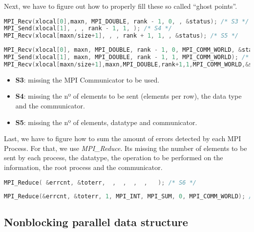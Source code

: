 \documentclass[a4paper, 10pt]{article}
\begin{document}
    Next, we have to figure out how to properly fill these so called ``ghost points''. 


    \begin{lstlisting}[language=c, caption={Template S3, S4, S5}]
MPI_Recv(xlocal[0],maxn, MPI_DOUBLE, rank - 1, 0, , &status); /* S3 */
MPI_Send(xlocal[1], , , rank - 1, 1, ); /* S4 */
MPI_Recv(xlocal[maxn/size+1], , , rank + 1, 1, , &status); /* S5 */
    \end{lstlisting}

    \begin{lstlisting}[language=c, caption={Correct S3, S4, S5}]
MPI_Recv(xlocal[0], maxn, MPI_DOUBLE, rank - 1, 0, MPI_COMM_WORLD, &status); /* S3 */
MPI_Send(xlocal[1], maxn, MPI_DOUBLE, rank - 1, 1, MPI_COMM_WORLD); /* S4 */
MPI_Recv(xlocal[maxn/size+1],maxn,MPI_DOUBLE,rank+1,1,MPI_COMM_WORLD,&status); /* S5 */
    \end{lstlisting}
    \begin{itemize}
	\item \textbf{S3}: missing the MPI Communicator to be used.
	\item \textbf{S4}: missing the nº of elements to be sent (elements per row), the data type and 
	    the communicator.
	\item \textbf{S5}: missing the nº of elements, datatype and communicator.
    \end{itemize}

    Last, we have to figure how to sum the amount of errors detected by each MPI Process. For that, we use \textit{MPI\_Reduce}. Its missing the number of elements to be sent by each process, the datatype, the operation to be performed on the information, the root process and the communicator.

    \begin{lstlisting}[language=c, caption={Template S6}]
MPI_Reduce( &errcnt, &toterr,  ,  ,  ,  ,   ); /* S6 */
    \end{lstlisting}

    \begin{lstlisting}[language=c, caption={Correct S6}]
MPI_Reduce(&errcnt, &toterr, 1, MPI_INT, MPI_SUM, 0, MPI_COMM_WORLD); /* S6 */
    \end{lstlisting}



\subsection{Nonblocking parallel data structure}
\end{document}
